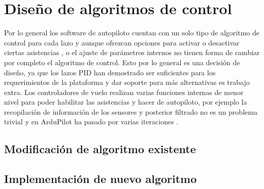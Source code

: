 \chapter{Diseño de algoritmos de control}

Por lo general los software de autopiloto cuentan con un solo tipo de algoritmo de control para cada lazo y aunque ofrezcan opciones para activar o desactivar ciertas asistencias \cite{ardupilot-flight-modes}, o el ajuste de parámetros internos \cite{ardupilot-plane-tuning} no tienen forma de cambiar por completo el algoritmo de control. Esto por lo general es una decisión de diseño, ya que los lazos PID han demostrado ser suficientes para los requerimientos de la plataforma y dar soporte para más alternativas es trabajo extra. Los controladores de vuelo realizan varias funciones internas de menor nivel para poder habilitar las asistencias y hacer de autopiloto, por ejemplo la recopilación de información de los sensores y posterior filtrado no es un problema trivial y en ArduPilot ha pasado por varias iteraciones \cite{ardupilot-ekf}.

\section{Modificación de algoritmo existente}

\section{Implementación de nuevo algoritmo}
